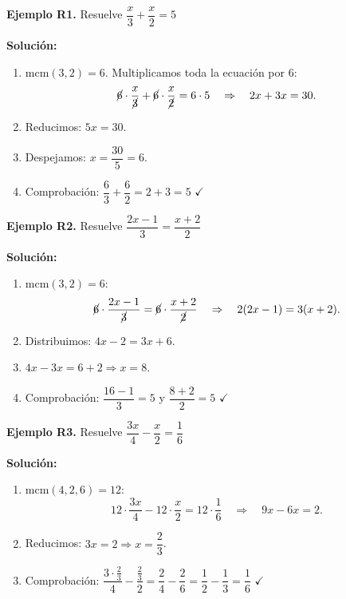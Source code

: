 \documentclass[12pt, letterpaper]{article}
\begin{document}
\textbf{Ejemplo R1.} Resuelve $\dfrac{x}{3} + \dfrac{x}{2} = 5$

\begin{cuadrosolucion}
  \textbf{Solución:}
  \begin{enumerate}
    \item mcm$(3, 2) = 6$. Multiplicamos toda la ecuación por 6:
          $$\cancel{6} \cdot \frac{x}{\cancel{3}} + \cancel{6} \cdot \frac{x}{\cancel{2}} = 6 \cdot 5 \quad \Rightarrow \quad 2x + 3x = 30.$$
    \item Reducimos: $5x = 30$.
    \item Despejamos: $x = \dfrac{30}{5} = 6$.
    \item Comprobación: $\dfrac{6}{3} + \dfrac{6}{2} = 2 + 3 = 5$ $\checkmark$
  \end{enumerate}
\end{cuadrosolucion}

\textbf{Ejemplo R2.} Resuelve $\dfrac{2x - 1}{3} = \dfrac{x + 2}{2}$
\newpage
\begin{cuadrosolucion}
  \textbf{Solución:}
  \begin{enumerate}
    \item mcm$(3, 2) = 6$:
          $$\cancel{6} \cdot \frac{2x - 1}{\cancel{3}} = \cancel{6} \cdot \frac{x + 2}{\cancel{2}} \quad \Rightarrow \quad 2(2x - 1) = 3(x + 2).$$
    \item Distribuimos: $4x - 2 = 3x + 6$.
    \item $4x - 3x = 6 + 2 \Rightarrow x = 8$.
    \item Comprobación: $\dfrac{16 - 1}{3} = 5$ y $\dfrac{8 + 2}{2} = 5$ $\checkmark$
  \end{enumerate}
\end{cuadrosolucion}

\textbf{Ejemplo R3.} Resuelve $\dfrac{3x}{4} - \dfrac{x}{2} = \dfrac{1}{6}$

\begin{cuadrosolucion}
  \textbf{Solución:}
  \begin{enumerate}
    \item mcm$(4, 2, 6) = 12$:
          $$12 \cdot \frac{3x}{4} - 12 \cdot \frac{x}{2} = 12 \cdot \frac{1}{6} \quad \Rightarrow \quad 9x - 6x = 2.$$
    \item Reducimos: $3x = 2 \Rightarrow x = \dfrac{2}{3}$.
    \item Comprobación: $\dfrac{3 \cdot \frac{2}{3}}{4} - \dfrac{\frac{2}{3}}{2} = \dfrac{2}{4} - \dfrac{2}{6} = \dfrac{1}{2} - \dfrac{1}{3} = \dfrac{1}{6}$ $\checkmark$
  \end{enumerate}
\end{cuadrosolucion}
\end{document}
